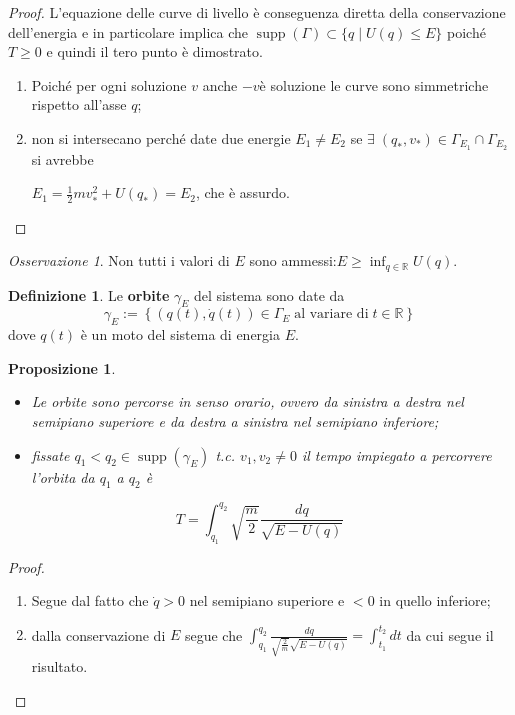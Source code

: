 \documentclass{book}
\theoremstyle{plain}
\theoremstyle{plain}
\theoremstyle{plain}
\theoremstyle{plain}
\theoremstyle{plain}
\newtheorem{prop}{Proposizione}[chapter]
\theoremstyle{definition}
\newtheorem{defi}{Definizione}[chapter]
\theoremstyle{remark}
\newtheorem*{oss}{Osservazione}
\theoremstyle{definition}
\begin{document}
\begin{proof}
    L'equazione delle curve di livello è conseguenza diretta della conservazione dell'energia e in particolare implica che $\operatorname{supp}(\Gamma)\subset\{q\;|\; U(q) \leq E\}$ poiché $T\geq0$ e quindi il tero punto è dimostrato.
    \begin{enumerate}
        \item Poiché per ogni soluzione $v$ anche $-v$è soluzione le curve sono simmetriche rispetto all'asse $q$;
        \item non si intersecano perché date due energie $E_1\neq E_2$ se $\exists\;(q_*, v_*)\in\Gamma_{E_1}\cap\Gamma_{E_2}$ si avrebbe
        
        \noindent $E_1=\frac{1}{2}mv_*^2+U(q_*)=E_2$, che è assurdo.
    \end{enumerate}
\end{proof}

\begin{oss}
    Non tutti i valori di $E$ sono ammessi:$E\ge \inf_{q\in\mathbb{R}}U(q)$.
\end{oss}

\begin{defi}
    Le \textbf{orbite} $\gamma_E$ del sistema sono date da
    \begin{displaymath}
        \boxed{
        \gamma_E := \left\{(q(t),\dot{q}(t))\in\Gamma_E \; \text{al variare di} \; t \in \mathbb{R}\right\}
        }
    \end{displaymath}
    dove $q(t)$ è un moto del sistema di energia $E$.
\end{defi}

\begin{prop}

\noindent 
\begin{itemize}
    \item Le orbite sono percorse in senso orario, ovvero da sinistra a destra nel semipiano superiore e da destra a sinistra nel semipiano inferiore;
    \item fissate $q_1<q_2 \in \operatorname{supp}(\gamma_E)$ t.c. $v_1, v_2 \neq 0$ il tempo impiegato a percorrere l'orbita da $q_1$ a $q_2$ è
\end{itemize}
     \begin{displaymath}
         T=\int_{q_1}^{q_2}\sqrt{\frac{m}{2}}\frac{dq}{\sqrt{E-U(q)}}
     \end{displaymath}
\end{prop}

\begin{proof}

\noindent 
    \begin{enumerate}
        \item Segue dal fatto che $\Dot{q}>0$ nel semipiano superiore e $<0$ in quello inferiore;
        \item dalla conservazione di $E$ segue che $\int_{q_1}^{q_2}\frac{dq}{\sqrt{\frac{2}{m}}\sqrt{E-U(q)}}=\int_{t_1}^{t_2}dt$ da cui segue il risultato.
    \end{enumerate}
\end{proof}
\end{document}
